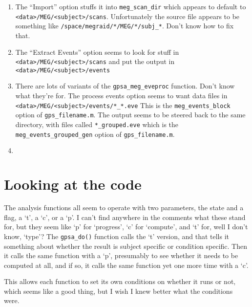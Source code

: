 \documentclass[11pt]{article}
\begin{document}
\begin{enumerate}

\item The ``Import'' option
stuffs it into \verb+meg_scan_dir+ which appears to default to
\verb+<data>/MEG/<subject>/scans+.  Unfortunately the source file
appears to be something like \verb+/space/megraid/*/MEG/*/subj_*+.
Don't know how to fix that.

\item The ``Extract Events'' option seems to look for stuff in
  \verb+<data>/MEG/<subject>/scans+ and put the output in
  \verb+<data>/MEG/<subject>/events+

\item There are lots of variants of the \verb+gpsa_meg_eveproc+
  function.  Don't know what they're for.  The process events option
  seems to want data files in
  \verb+<data>/MEG/<subject>/events/*_*.eve+  This is the
  \verb+meg_events_block+ option of \verb+gps_filename.m+.  The output
  seems to be steered back to the same directory, with files called
  \verb+*_grouped.eve+ which is the \verb+meg_events_grouped_gen+
  option of \verb+gps_filename.m+.

\item

\end{enumerate}

\section{Looking at the code}

The analysis functions all seem to operate with two parameters, the
state and a flag, a `t', a `c', or a `p'.  I can't find anywhere in
the comments what these stand for, but they seem like `p' for
`progress', `c' for `compute', and `t' for, well I don't know,
`type'?  The \verb+gpsa_do()+ function calls the `t' version, and that
tells it something about whether the result is subject specific or
condition specific.  Then it calls the same function with a `p',
presumably to see whether it needs to be computed at all, and if so,
it calls the same function yet one more time with a `c'.

This allows each function to set its own conditions on whether it runs
or not, which seems like a good thing, but I wish I knew better what
the conditions were.
\end{document}
